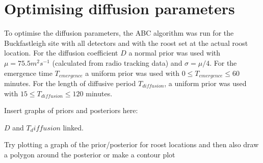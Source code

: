 \section{Optimising diffusion parameters}

To optimise the diffusion parameters, the ABC algorithm was run for the
Buckfastleigh site with all detectors and with the roost set at the actual roost
location. For the diffusion coefficient $D$ a normal prior was used with $\mu =
75.5 m^2s^{-1}$ (calculated from radio tracking data) and $\sigma = \mu/4$. For
the emergence time $T_{emergence}$ a uniform prior was used with $0 \leq
T_{emergence} \leq 60$ minutes. For the length of diffusive period
$T_{diffusion}$, a uniform prior was used with $ 15 \leq T_{diffusion} \leq 120$
minutes. 


Insert graphs of priors and posteriors here:


$D$ and $T_diffusion$ linked.

Try plotting a graph of the prior/posterior for roost locations and then also
draw a polygon around the posterior or make a contour plot